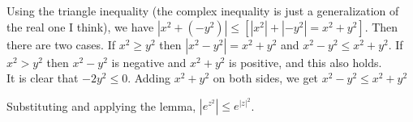 \documentclass{article}
\theoremstyle{definition}
\newcommand{\cs}[1]{\color{blue}{#1}\normalcolor}
\begin{document}
\cs{ I realize now that this was a clunky way of verifying this }Using the triangle inequality (the complex inequality is just a generalization of the real one I think), we have $|x^2 + (-y^2)| \le[|x^2| + |-y^2| = x^2 + y^2]$. Then there are two cases. If $x^2 \ge y^2$ then $|x^2 - y^2| = x^2 + y^2$ and $x^2 - y^2 \le x^2 + y^2$. If $x^2> y^2$ then $x^2 -y^2$ is negative and $x^2 + y^2$ is positive, and this also holds.\\

\cs{this way was better} It is clear that $-2y^2 \le 0$. Adding $x^2 + y^2$ on both sides, we get $x^2 - y^2 \le x^2 + y^2$\\ \cs{Agreed. I also would have just accepted it as clear. :)}



Substituting and applying the lemma, $|e^{z^2}| \le e^{|z|^2}$.

\cs{5/5}
\end{document}
